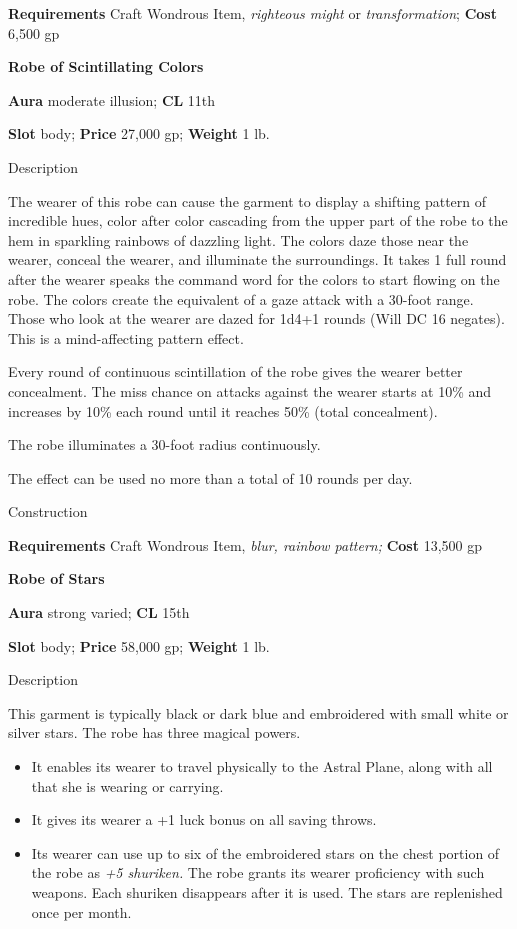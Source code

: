 \textbf{Requirements }Craft Wondrous Item, \textit{righteous might }or \textit{transformation}; \textbf{Cost} 6,500 gp
				
\textbf{Robe of Scintillating Colors}
				
\textbf{Aura} moderate illusion;\textbf{ CL }11th
				
\textbf{Slot} body; \textbf{Price} 27,000 gp; \textbf{Weight} 1 lb.
				
Description
				
The wearer of this robe can cause the garment to display a shifting pattern of incredible hues, color after color cascading from the upper part of the robe to the hem in sparkling rainbows of dazzling light. The colors daze those near the wearer, conceal the wearer, and illuminate the surroundings. It takes 1 full round after the wearer speaks the command word for the colors to start flowing on the robe. The colors create the equivalent of a gaze attack with a 30-foot range. Those who look at the wearer are dazed for 1d4+1 rounds (Will DC 16 negates). This is a mind-affecting pattern effect.
				
Every round of continuous scintillation of the robe gives the wearer better concealment. The miss chance on attacks against the wearer starts at 10\% and increases by 10\% each round until it reaches 50\% (total concealment).
				
The robe illuminates a 30-foot radius continuously.
				
The effect can be used no more than a total of 10 rounds per day. 
				
Construction
				
\textbf{Requirements} Craft Wondrous Item,\textit{ blur, rainbow pattern;}\textbf{ Cost }13,500 gp
				
\textbf{Robe of Stars}
				
\textbf{Aura} strong varied;\textbf{ CL }15th
				
\textbf{Slot} body; \textbf{Price} 58,000 gp; \textbf{Weight} 1 lb.
				
Description
				
This garment is typically black or dark blue and embroidered with small white or silver stars. The robe has three magical powers.
				\begin{itemize}\item  It enables its wearer to travel physically to the Astral Plane, along with all that she is wearing or carrying.
				\item  It gives its wearer a +1 luck bonus on all saving throws.
				\item  Its wearer can use up to six of the embroidered stars on the chest portion of the robe as \textit{+5 shuriken.} The robe grants its wearer proficiency with such weapons. Each shuriken disappears after it is used. The stars are replenished once per month.
\end{itemize}
				
